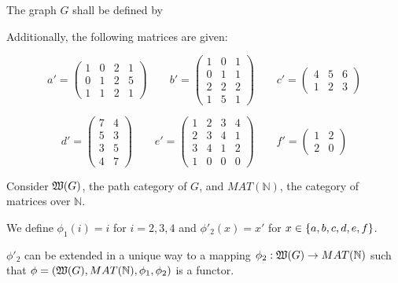 \begin{example}
The graph $G$ shall be defined by

\begin{center}

\end{center}

Additionally, the following matrices are given:

\[
a' = \left( \begin{array}{cccc}
1 & 0 & 2 & 1 \\ 0 & 1 & 2 & 5 \\ 1 & 1 & 2 & 1
\end{array} \right)
\qquad 
b' = \left( \begin{array}{ccc}
1 & 0 & 1 \\ 0 & 1 & 1 \\ 2 & 2 & 2 \\ 1 & 5 & 1
\end{array} \right)
\qquad 
c' = \left( \begin{array}{ccc}
4 & 5 & 6 \\ 1 & 2 & 3
\end{array} \right)
\]

\[
d' = \left( \begin{array}{cc}
7 & 4 \\ 5 & 3 \\ 3 & 5 \\ 4 & 7
\end{array} \right)
\qquad
e' = \left( \begin{array}{cccc}
1&2&3&4 \\ 2&3&4&1 \\ 3&4&1&2 \\ 1&0&0&0
\end{array} \right)
\qquad
f' = \left( \begin{array}{cc}
1&2 \\ 2&0
\end{array} \right)
\]

Consider $\mbox{$\mathfrak{W}({G})$}$, the path category of $G$, and $MAT(\mathbb{N})$,
the category of matrices over $\mathbb{N}$.

We define $\phi_1(i) = i$ for $i = 2,3,4$ and $\phi'_2(x) = x'$ for $x \in
\mbox{$\{a, b, c, d, e, f\}$}$.

$\phi'_2$ can be extended in a unique way to a mapping $\phi_2 :
\mbox{$\mathfrak{W}({G})$} \to MAT(\mathbb{N})$ such that $\phi = (\mbox{$\mathfrak{W}({G})$},
MAT(\mathbb{N}), \phi_1, \phi_2)$ is a functor.
\end{example}

